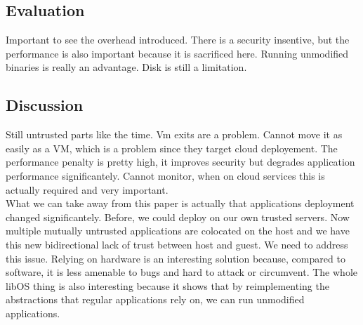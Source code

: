 \subsection{Evaluation}
Important to see the overhead introduced.
There is a security insentive, but the performance is also important because it is sacrificed here.
Running unmodified binaries is really an advantage.
Disk is still a limitation.
\subsection{Discussion}

Still untrusted parts like the time.
Vm exits are a problem.
Cannot move it as easily as a VM, which is a problem since they target cloud deployement.
The performance penalty is pretty high, it improves security but degrades application performance significantely.
Cannot monitor, when on cloud services this is actually required and very important.\\

What we can take away from this paper is actually that applications deployment changed significantely.
Before, we could deploy on our own trusted servers.
Now multiple mutually untrusted applications are colocated on the host and we have this new bidirectional lack of trust between host and guest.
We need to address this issue.
Relying on hardware is an interesting solution because, compared to software, it is less amenable to bugs and hard to attack or circumvent.
The whole libOS thing is also interesting because it shows that by reimplementing the abstractions that regular applications rely on, we can run unmodified applications.